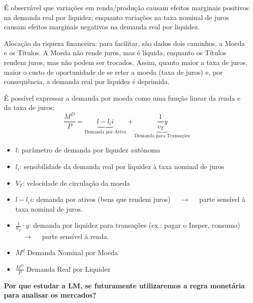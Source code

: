 \documentclass[a4paper,12pt]{article}[abntex2]
\begin{document}
É observável que variações em renda/produção causam efeitos marginais positivos na demanda real por liquidez; enquanto variações na taxa nominal de juros causam efeitos marginais negativos na demanda real por liquidez. 

Alocação da riqueza financeira: para facilitar, são dados dois caminhos, a Moeda e os Títulos. A Moeda não rende juros, mas é líquida, enquanto os Títulos rendem juros, mas não podem ser trocados. Assim, quanto maior a taxa de juros, maior o custo de oportunidade de se reter a moeda (taxa de juros) e, por consequência, a demanda real por liquidez é deprimida.  

É possível expressar a demanda por moeda como uma função linear da renda e da taxa de juros:
$$
\frac{M^D}{P}=\underbrace{l-l_ii}_\text{Demanda por Ativo} + \underbrace{\frac{1}{v_T}y}_\text{Demanda para Transações}
$$

\begin{itemize}
    \item $l$: parâmetro de demanda por liquidez autônoma
    \item $l_i$: sensibilidade da demanda real por liquidez à taxa nominal de juros
    \item $V_T$: velocidade de circulação da moeda
    \item $l - l_ii$: demanda por ativos (bens que rendem juros) $\quad \rightarrow \quad$ parte sensível à taxa nominal de juros.
    \item $\frac{1}{V_T} \cdot y$: demanda por liquidez para transações (ex.: pagar o Insper, consumo) $\quad \rightarrow \quad$ parte sensível à renda.
    \item $M^d$ Demanda Nominal por Moeda
    \item $\frac{M^D}{P}$ Demanda Real por Liquidez
\end{itemize}


\textbf{Por  que  estudar  a LM,  se  futuramente  utilizaremos  a  regra  monetária  para  analisar  os mercados? }
\end{document}
